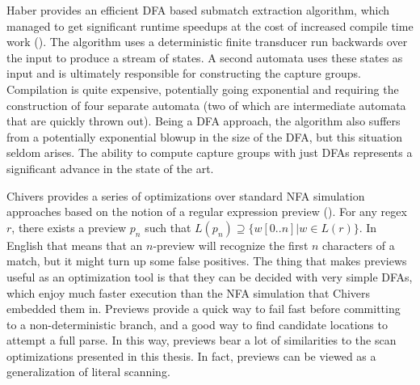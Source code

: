 Haber provides an efficient DFA based submatch extraction algorithm,
which managed to get significant runtime speedups at the cost of
increased compile time work (\cite{Haber2013}). The algorithm uses
a deterministic finite transducer run backwards over the input
to produce a stream of states. A second automata uses these
states as input and is ultimately responsible for constructing
the capture groups. Compilation is quite expensive, potentially
going exponential and requiring the construction of four separate
automata (two of which are intermediate automata that are quickly
thrown out). Being a DFA approach, the algorithm also suffers from
a potentially exponential blowup in the size of the DFA, but this
situation seldom arises. The ability to compute capture groups with
just DFAs represents a significant advance in the state of the art.

Chivers provides a series of optimizations over standard NFA simulation
approaches based on the notion of a regular expression preview
(\cite{Chivers2016}). For any regex $r$, there exists a preview $p_n$
such that $L(p_n) \supseteq \{ w[0..n] | w \in L(r) \}$. In English
that means that an $n$-preview will recognize the first $n$ characters
of a match, but it might turn up some false positives. The thing that
makes previews useful as an optimization tool is that they can be
decided with very simple DFAs, which enjoy much faster execution than
the NFA simulation that Chivers embedded them in. Previews provide
a quick way to fail fast before committing to a non-deterministic
branch, and a good way to find candidate locations to attempt a
full parse. In this way, previews bear a lot of similarities to the
scan optimizations presented in this thesis. In fact, previews can be
viewed as a generalization of literal scanning.



